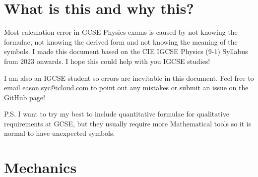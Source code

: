 \documentclass[8pt]{article}
\author{\Author}
\title{\Title}
\date{Version 1. \Date}
\begin{document}
	\maketitle

	\tableofcontents

    \section*{What is this and why this?}
        Most calculation error in GCSE Physics exams is caused by not knowing the formulae, not knowing the derived form and not knowing the meaning of the symbols. I made this document based on the CIE IGCSE Physics (9-1) Syllabus from 2023 onwards. I hope this could help with you IGCSE studies!

        I am also an IGCSE student so errors are inevitable in this document. Feel free to email \href{eason.syc@icloud.com}{eason.syc@icloud.com} to point out any mistakes or submit an issue on the GitHub page!

        P.S. I want to try my best to include quantitative formulae for qualitative requirements at GCSE, but they usually require more Mathematical tools so it is normal to have unexpected symbols.

    \section{Mechanics}
\end{document}
